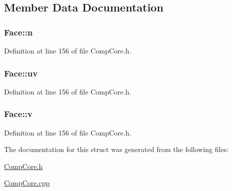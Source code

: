 \subsection{Member Data Documentation}
\hypertarget{struct_face_a89627fa35380d411e31d45e8bf7a03ac}{
\subsubsection[{n}]{ Face\-::n}}\label{struct_face_a89627fa35380d411e31d45e8bf7a03ac}


Definition at line 156 of file Comp\-Core.\-h.

\hypertarget{struct_face_ac37801a984b6845429c0d73ad836d551}{
\subsubsection[{uv}]{ Face\-::uv}}\label{struct_face_ac37801a984b6845429c0d73ad836d551}


Definition at line 156 of file Comp\-Core.\-h.

\hypertarget{struct_face_a0425ff83722a4bd41c020f480a6fc8fe}{
\subsubsection[{v}]{ Face\-::v}}\label{struct_face_a0425ff83722a4bd41c020f480a6fc8fe}


Definition at line 156 of file Comp\-Core.\-h.



The documentation for this struct was generated from the following files\-:\begin{DoxyCompactItemize}
\item 
\hyperlink{_comp_core_8h}{Comp\-Core.\-h}\item 
\hyperlink{_comp_core_8cpp}{Comp\-Core.\-cpp}\end{DoxyCompactItemize}
